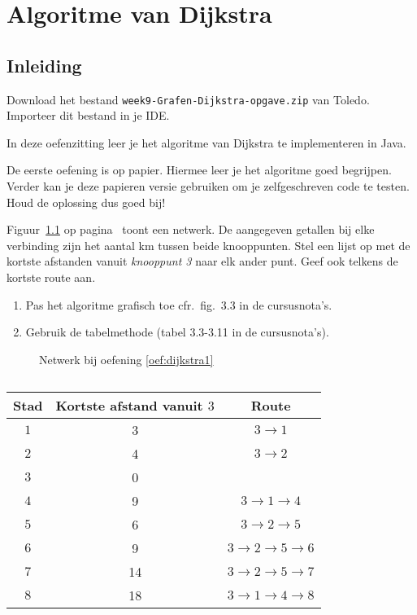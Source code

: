 
\chapter{Algoritme van Dijkstra}

\section*{Inleiding}
Download het bestand \verb/week9-Grafen-Dijkstra-opgave.zip/ van Toledo. Importeer dit bestand in je IDE.

In deze oefenzitting leer je het algoritme van Dijkstra te implementeren in Java.

De eerste oefening is op papier. Hiermee leer je het algoritme goed begrijpen. Verder kan je deze papieren versie gebruiken om je zelfgeschreven code te testen. Houd de oplossing dus goed bij!

\begin{oef}
\label{oef:dijkstra1}
\papier Figuur~\ref{fig:oefDijkstra1} op pagina~\pageref{fig:oefDijkstra1} toont een netwerk. De aangegeven getallen bij
elke verbinding zijn het aantal km tussen beide knooppunten. Stel
een lijst op met de kortste afstanden vanuit \emph{knooppunt 3} naar elk ander
punt. Geef ook telkens de kortste route aan.
\begin{enumerate}
\item Pas het algoritme grafisch toe cfr.\ fig.\ 3.3 in de cursusnota's.
\item Gebruik de tabelmethode (tabel 3.3-3.11 in de cursusnota's).
\end{enumerate}
\begin{figure}[htbp]
     \centering

     \caption{Netwerk bij oefening \ref{oef:dijkstra1}}
     \label{fig:oefDijkstra1}
\end{figure}
\begin{opl}
$\quad$\\
$\quad$\\
\begin{tabular}{ccc}
\toprule
Stad & Kortste afstand vanuit $3$ & Route \\
\midrule
$1$ & 3 & $3\rightarrow 1$ \\
\midrule
$2$ & 4 & $3\rightarrow 2$ \\
\midrule
$3$ & 0 \\
\midrule
$4$ & 9&$3\rightarrow 1 \rightarrow 4$ \\
\midrule
$5$ & 6 & $3\rightarrow 2 \rightarrow 5$\\
\midrule
$6$ & 9 & $3\rightarrow 2 \rightarrow 5 \rightarrow 6$ \\
\midrule
$7$ & 14 & $3 \rightarrow 2 \rightarrow 5 \rightarrow 7$ \\
\midrule
$8$ & 18 & $3 \rightarrow 1 \rightarrow 4 \rightarrow 8$ \\
\bottomrule
\end{tabular}
\end{opl}
\end{oef}


